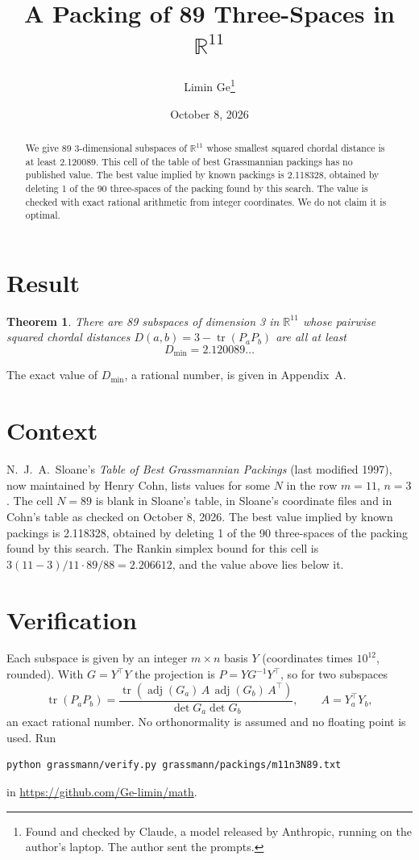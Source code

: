 \documentclass[11pt,a4paper]{article}
\title{A Packing of 89 Three-Spaces in $\mathbb{R}^{11}$}
\author{Limin Ge\thanks{Found and checked by Claude, a model released by Anthropic, running on the author's laptop. The author sent the prompts.}}
\date{October 8, 2026}
\newtheorem*{theorem}{Theorem}
\begin{document}
\maketitle
\begin{abstract}
We give 89 3-dimensional subspaces of $\mathbb{R}^{11}$ whose smallest squared chordal distance is at least 2.120089. This cell of the table of best Grassmannian packings has no published value. The best value implied by known packings is 2.118328, obtained by deleting 1 of the 90 three-spaces of the packing found by this search. The value is checked with exact rational arithmetic from integer coordinates. We do not claim it is optimal.
\end{abstract}

\section{Result}
\begin{theorem}
There are 89 subspaces of dimension 3 in $\mathbb{R}^{11}$ whose pairwise squared chordal distances $D(a,b) = 3 - \operatorname{tr}(P_aP_b)$ are all at least
\[ D_{\min} = 2.120089\ldots \]
\end{theorem}
The exact value of $D_{\min}$, a rational number, is given in Appendix~A.


\section{Context}
N.~J.~A.~Sloane's \emph{Table of Best Grassmannian Packings} (last modified 1997), now maintained by Henry Cohn, lists values for some $N$ in the row $m=11$, $n=3$. The cell $N=89$ is blank in Sloane's table, in Sloane's coordinate files and in Cohn's table as checked on October 8, 2026. The best value implied by known packings is 2.118328, obtained by deleting 1 of the 90 three-spaces of the packing found by this search. The Rankin simplex bound for this cell is $3(11-3)/11\cdot 89/88 = 2.206612$, and the value above lies below it.


\section{Verification}
Each subspace is given by an integer $m\times n$ basis $Y$ (coordinates times $10^{12}$, rounded). With $G=Y^\top Y$ the projection is $P=YG^{-1}Y^\top$, so for two subspaces
\[ \operatorname{tr}(P_aP_b)=\frac{\operatorname{tr}(\operatorname{adj}(G_a)\,A\,\operatorname{adj}(G_b)\,A^\top)}{\det G_a\det G_b},\qquad A=Y_a^\top Y_b, \]
an exact rational number. No orthonormality is assumed and no floating point is used. Run
\begin{verbatim}
python grassmann/verify.py grassmann/packings/m11n3N89.txt
\end{verbatim}
in \url{https://github.com/Ge-limin/math}.
\end{document}
